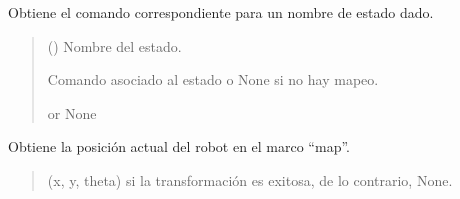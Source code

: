 \documentclass[a4paper,10pt,spanish]{sphinxmanual}
\begin{document}
\begin{fulllineitems}
\begin{fulllineitems}
\label{\detokenize{squad_state_manager:squad_interfaz.InterfazManager.get_command_for_state}}
\pysigstartsignatures
{}
\pysigstopsignatures
\sphinxAtStartPar
Obtiene el comando correspondiente para un nombre de estado dado.
\begin{quote}\begin{description}
\sphinxAtStartPar
{} () \textendash{} Nombre del estado.

\sphinxAtStartPar
Comando asociado al estado o None si no hay mapeo.

\sphinxAtStartPar
{} or None

\end{description}\end{quote}

\end{fulllineitems}


\begin{fulllineitems}
\label{\detokenize{squad_state_manager:squad_interfaz.InterfazManager.get_robot_pose}}
\pysigstartsignatures
{}
\pysigstopsignatures
\sphinxAtStartPar
Obtiene la posición actual del robot en el marco “map”.
\begin{quote}\begin{description}
\sphinxAtStartPar
(x, y, theta) si la transformación es exitosa, de lo contrario, None.

\sphinxAtStartPar
{}

\end{description}\end{quote}

\end{fulllineitems}


\end{fulllineitems}
\end{document}
